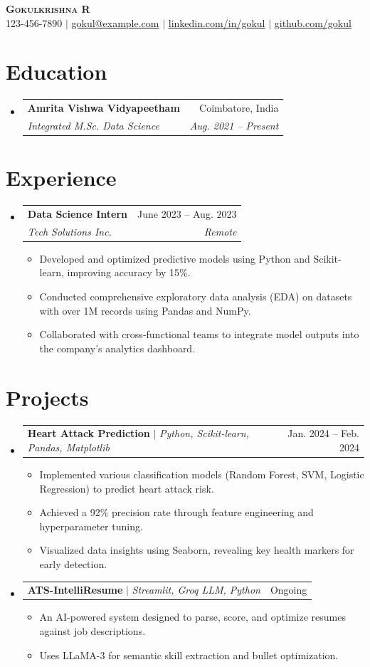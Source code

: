 \documentclass[letterpaper,11pt]{article}
\makeatletter
\newcommand{\resumeItem}[1]{
  \item\small{
    {#1 \vspace{-2pt}}
  }
}
\newcommand{\resumeSubheading}[4]{
  \vspace{-2pt}\item
    \begin{tabular*}{0.97\textwidth}[t]{l@{\extracolsep{\fill}}r}
      \textbf{#1} & #2 \\
      \textit{\small#3} & \textit{\small #4} \\
    \end{tabular*}\vspace{-7pt}
}
\newcommand{\resumeProjectHeading}[2]{
    \item
    \begin{tabular*}{0.97\textwidth}{l@{\extracolsep{\fill}}r}
      \small#1 & #2 \\
    \end{tabular*}\vspace{-7pt}
}
\newcommand{\resumeSubHeadingListStart}{\begin{itemize}[leftmargin=0.15in, label={}]}
\newcommand{\resumeSubHeadingListEnd}{\end{itemize}}
\newcommand{\resumeItemListStart}{\begin{itemize}}
\newcommand{\resumeItemListEnd}{\end{itemize}\vspace{-5pt}}
\makeatother
\begin{document}
\begin{center}
    \textbf{\Huge \scshape Gokulkrishna R} \\ \vspace{1pt}
    \small 123-456-7890 $|$ \href{mailto:gokul@example.com}{\underline{gokul@example.com}} $|$ 
    \href{https://linkedin.com/in/gokul}{\underline{linkedin.com/in/gokul}} $|$
    \href{https://github.com/gokul}{\underline{github.com/gokul}}
\end{center}


\section{Education}
  \resumeSubHeadingListStart
    \resumeSubheading
      {Amrita Vishwa Vidyapeetham}{Coimbatore, India}
      {Integrated M.Sc. Data Science}{Aug. 2021 -- Present}
  \resumeSubHeadingListEnd


\section{Experience}
  \resumeSubHeadingListStart

    \resumeSubheading
      {Data Science Intern}{June 2023 -- Aug. 2023}
      {Tech Solutions Inc.}{Remote}
      \resumeItemListStart
        \resumeItem{Developed and optimized predictive models using Python and Scikit-learn, improving accuracy by 15\%.}
        \resumeItem{Conducted comprehensive exploratory data analysis (EDA) on datasets with over 1M records using Pandas and NumPy.}
        \resumeItem{Collaborated with cross-functional teams to integrate model outputs into the company's analytics dashboard.}
      \resumeItemListEnd
      
  \resumeSubHeadingListEnd


\section{Projects}
    \resumeSubHeadingListStart
      \resumeProjectHeading
          {\textbf{Heart Attack Prediction} $|$ \emph{Python, Scikit-learn, Pandas, Matplotlib}}{Jan. 2024 -- Feb. 2024}
          \resumeItemListStart
            \resumeItem{Implemented various classification models (Random Forest, SVM, Logistic Regression) to predict heart attack risk.}
            \resumeItem{Achieved a 92\% precision rate through feature engineering and hyperparameter tuning.}
            \resumeItem{Visualized data insights using Seaborn, revealing key health markers for early detection.}
          \resumeItemListEnd
      \resumeProjectHeading
          {\textbf{ATS-IntelliResume} $|$ \emph{Streamlit, Groq LLM, Python}}{Ongoing}
          \resumeItemListStart
            \resumeItem{An AI-powered system designed to parse, score, and optimize resumes against job descriptions.}
            \resumeItem{Uses LLaMA-3 for semantic skill extraction and bullet optimization.}
          \resumeItemListEnd
    \resumeSubHeadingListEnd
\end{document}
